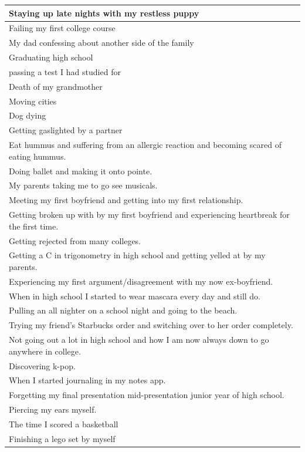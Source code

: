 \documentclass[
  .7em,
  letterpaper,
  DIV=11,
  numbers=noendperiod]{scrartcl}
\begin{document}
\begin{table}
\begin{tabular}{l}
\hline
Staying up late nights with my restless puppy\\
\hline
Failing my first college course\\
\hline
My dad confessing about another side of the family\\
\hline
Graduating high school\\
\hline
passing a test I had studied for\\
\hline
Death of my grandmother\\
\hline
Moving cities\\
\hline
Dog dying\\
\hline
Getting gaslighted by a partner\\
\hline
Eat hummus and suffering from an allergic reaction and becoming scared of eating hummus.\\
\hline
Doing ballet and making it onto pointe.\\
\hline
My parents taking me to go see musicals.\\
\hline
Meeting my first boyfriend and getting into my first relationship.\\
\hline
Getting broken up with by my first boyfriend and experiencing heartbreak for the first time.\\
\hline
Getting rejected from many colleges.\\
\hline
Getting a C in trigonometry in high school and getting yelled at by my parents.\\
\hline
Experiencing my first argument/disagreement with my now ex-boyfriend.\\
\hline
When in high school I started to wear mascara every day and still do.\\
\hline
Pulling an all nighter on a school night and going to the beach.\\
\hline
Trying my friend's Starbucks order and switching over to her order completely.\\
\hline
Not going out a lot in high school and how I am now always down to go anywhere in college.\\
\hline
Discovering k-pop.\\
\hline
When I started journaling in my notes app.\\
\hline
Forgetting my final presentation mid-presentation junior year of high school.\\
\hline
Piercing my ears myself.\\
\hline
The time I scored a basketball\\
\hline
Finishing a lego set by myself\\

\end{tabular}
\end{table}
\end{document}
